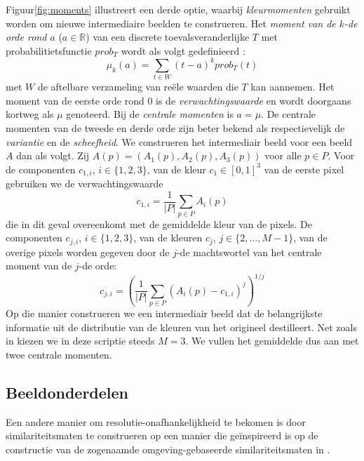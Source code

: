 Figuur\ref{fig:moments} illustreert een derde optie, waarbij \emph{kleurmomenten} gebruikt
worden om nieuwe intermediaire beelden te construeren. Het \emph{moment van de $k$-de orde rond $a$} ($a
\in \mathbb{R}$) van een discrete toevalsveranderlijke $T$ met
probabilitietsfunctie $prob_T$ wordt als volgt gedefinieerd
\cite{demeyder:statistiek}: 
$$
\mu_k(a) = \sum_{t \in W} (t-a)^k prob_T(t)
$$
met $W$ de aftelbare verzameling van re\"ele waarden die $T$ kan aannemen. Het
moment
van de eerste orde rond $0$ is de \emph{verwachtingswaarde} en wordt doorgaans kortweg als
$\mu$ genoteerd. Bij de \emph{centrale momenten} is $a=\mu$. De centrale 
momenten van de tweede en derde orde zijn beter bekend als respectievelijk de
\emph{variantie} en de \emph{scheefheid}. We construeren het intermediair beeld
voor een beeld $A$ dan als volgt. Zij $A(p)=(A_1(p),A_2(p),A_3(p))$ voor
alle $p \in P$. Voor de componenten $c_{1,i}$, $i \in \{1,2,3\}$, van de
kleur $c_1 \in [0,1]^3$ van de eerste pixel gebruiken we de verwachtingswaarde $$
c_{1,i} = \frac{1}{|P|} \sum_{p \in P} A_i(p)  
$$
die in dit geval overeenkomt met de gemiddelde kleur van de pixels.
De componenten $c_{j,i}$, $i \in \{1,2,3\}$, van de kleuren $c_j$, $j \in
\{2,\ldots,M-1\}$, van de overige pixels worden gegeven door de $j$-de
machtswortel van het centrale moment van de $j$-de orde: $$
c_{j,i} = \left( \frac{1}{|P|} \sum_{p \in P} (A_i(p) - c_{1,i})^j \right)^{1/j}
$$  
Op die manier construeren we een intermediair beeld dat de
belangrijkste informatie uit de distributie van de kleuren van het origineel
destilleert. Net zoals in \cite{stricker:similarity_of_color_images} kiezen we 
in deze scriptie steeds $M = 3$. We vullen het gemiddelde dus aan met twee
centrale momenten.

\subsection{Beeldonderdelen}

Een andere manier om resolutie-onafhankelijkheid te bekomen is door similariteitsmaten te construeren 
op een manier die ge\"inspireerd is op de constructie van de zogenaamde omgeving-gebaseerde 
similariteitsmaten in \cite{vanderweken:similariteitsmaten}. 

